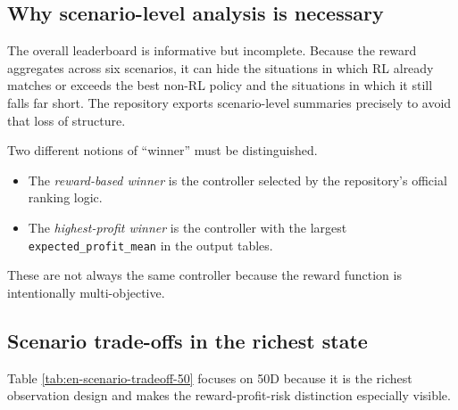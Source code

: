 \documentclass[12pt,a4paper]{article}
\begin{document}
\subsection{Why scenario-level analysis is necessary}

The overall leaderboard is informative but incomplete. Because the reward aggregates across six scenarios, it can hide the situations in which RL already matches or exceeds the best non-RL policy and the situations in which it still falls far short. The repository exports scenario-level summaries precisely to avoid that loss of structure.

Two different notions of ``winner'' must be distinguished.
\begin{itemize}[leftmargin=*]
    \item The \emph{reward-based winner} is the controller selected by the repository's official ranking logic.
    \item The \emph{highest-profit winner} is the controller with the largest \texttt{expected\_profit\_mean} in the output tables.
\end{itemize}

These are not always the same controller because the reward function is intentionally multi-objective.

\subsection{Scenario trade-offs in the richest state}

Table \ref{tab:en-scenario-tradeoff-50} focuses on 50D because it is the richest observation design and makes the reward-profit-risk distinction especially visible.
\end{document}
